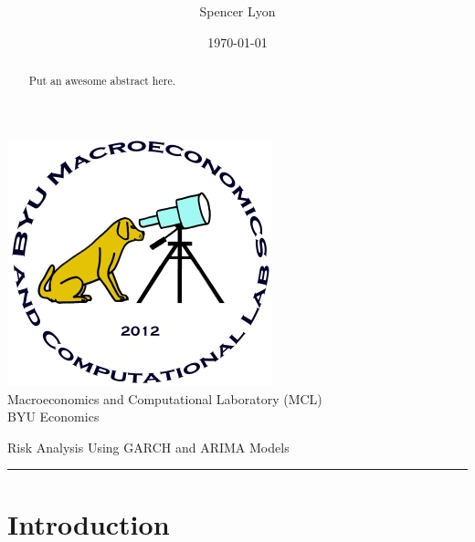 \documentclass[a4paper, 11pt]{article}
\title{
    \vspace{-.6in}
    \usefont{OT1}{bch}{b}{n}
    \normalfont \normalsize \textsc{ } \\ [25pt]
    \horrule{0.5pt}
    \huge \thetitle \\
    \horrule{2pt}
  }
\author{
    Spencer Lyon
  }
\date{
  \normalfont \normalsize
  \today \\[-4pt] \normalsize
  }
\theoremstyle{definition} %
\numberwithin{equation}{section}
\newcommand \thetitle{Risk Analysis Using GARCH and ARIMA Models}
\begin{document}
\begin{titlepage}
  \maketitle
  \thispagestyle{empty}
  \begin{center}

  \includegraphics{logo} \\ [0.8cm] %

  Macroeconomics and Computational Laboratory (MCL) \\[0.5cm] %
  BYU Economics\\[1.5cm]  %

  \begin{abstract}
      \normalsize
        Put an awesome abstract here.
  \end{abstract}
  \end{center}
  \tableofcontents
\end{titlepage}

\newpage
{}  %
\setcounter{page}{1}  %

\begin{center}
\huge{\thetitle}  %
\rule{\linewidth}{.1pt}
\end{center}


\section{Introduction} \label{sec:intro}
  \thispagestyle{empty}
  \pagestyle{mainDoc}
\end{document}
